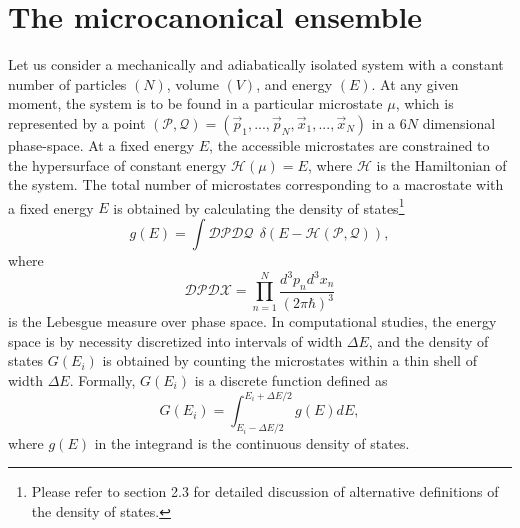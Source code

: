 \documentclass[12pt]{report}
\begin{document}
\section{The microcanonical ensemble}
\label{sec:mic_ensemble}
Let us consider a mechanically and adiabatically isolated system with a constant number of particles $(N)$, volume $(V)$, and energy $(E)$. At any given moment, the system is to be found in a particular microstate $\mu$, which is represented by a point $(\mathcal{P},\mathcal{Q}) = (\vec{p}_{1},...,\vec{p}_{N},\vec{x}_{1},...,\vec{x}_{N})$ in a $6N$ dimensional phase-space. At a fixed energy $E$, the accessible microstates are constrained to the hypersurface of constant energy $\mathcal{H}(\mu) = E$, where $\mathcal{H}$ is the Hamiltonian of the system. The total number of microstates corresponding to a macrostate with a fixed energy $E$ is obtained by calculating the density of states\footnote{Please refer to section 2.3 for detailed discussion of alternative definitions of the density of states.}
\begin{equation}
\label{eq:densityOfStatesTheoretic}
g(E) = \int \mathcal{DP}\mathcal{DQ} \:\: \delta(E - \mathcal{H}(\mathcal{P},\mathcal{Q})),
\end{equation} 
where 
\begin{equation}
\mathcal{DP}\mathcal{DX} = \prod_{n = 1}^{N} \frac{d^{3}p_{n}d^{3}x_{n}}{(2 \pi \hbar)^{3}}
\end{equation}
is the Lebesgue measure over phase space\cite{Rugh2001}. In computational studies, the energy space is by necessity discretized into intervals of width $\Delta E$, and the density of states $G(E_{i})$ is obtained by counting the microstates within a thin shell of width $\Delta E$. Formally, $G(E_{i})$ is a discrete function defined as
\begin{equation}
\label{eq:densitOfStatesExplicit}
G(E_{i}) = \int _{E_{i}-\Delta E/2} ^{E_{i}+\Delta E/2} g(E)dE,
\end{equation}
where $g(E)$ in the integrand is the continuous density of states\cite{Bachmann2014}.
\end{document}
